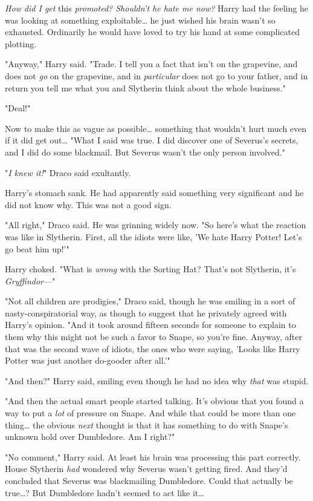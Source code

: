 \emph{How did I get} this\emph{ promoted? Shouldn't he hate me now?} Harry had 
the feeling he was looking at something exploitable{\ldots} he just wished his 
brain wasn't so exhausted. Ordinarily he would have loved to try his hand at 
some complicated plotting.

"Anyway," Harry said. "Trade. I tell you a fact that isn't on the grapevine, 
and does not \emph{go} on the grapevine, and in \emph{particular} does not go 
to your father, and in return you tell me what you and Slytherin think about 
the whole business."

"Deal!"

Now to make this as vague as possible{\ldots} something that wouldn't hurt much 
even if it did get out{\ldots} "What I said was true. I did discover one of 
Severus's secrets, and I did do some blackmail. But Severus wasn't the only 
person involved."

"\emph{I knew it!}" Draco said exultantly.

Harry's stomach sank. He had apparently said something very significant and he 
did not know why. This was not a good sign.

"All right," Draco said. He was grinning widely now. "So here's what the 
reaction was like in Slytherin. First, all the idiots were like, 'We hate Harry 
Potter! Let's go beat him up!'"

Harry choked. "What is \emph{wrong} with the Sorting Hat? That's not Slytherin, 
it's \emph{Gryffindor}---"

"Not all children are prodigies," Draco said, though he was smiling in a sort 
of nasty-conspiratorial way, as though to suggest that he privately agreed with 
Harry's opinion. "And it took around fifteen seconds for someone to explain to 
them why this might not be such a favor to Snape, so you're fine. Anyway, after 
that was the second wave of idiots, the ones who were saying, 'Looks like Harry 
Potter was just another do-gooder after all.'"

"And then?" Harry said, smiling even though he had no idea why \emph{that} was 
stupid.

"And then the actual smart people started talking. It's obvious that you found 
a way to put a \emph{lot} of pressure on Snape. And while that could be more 
than one thing{\ldots} the obvious \emph{next} thought is that it has something 
to do with Snape's unknown hold over Dumbledore. Am I right?"

"No comment," Harry said. At least his brain was processing this part 
correctly. House Slytherin \emph{had} wondered why Severus wasn't getting 
fired. And they'd concluded that Severus was blackmailing Dumbledore. Could 
that actually be true{\ldots}? But Dumbledore hadn't seemed to act like 
it{\ldots}

